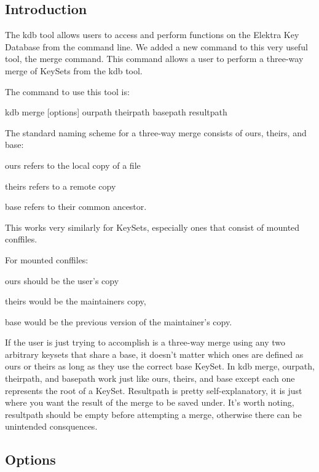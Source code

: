 \subsection*{Introduction}

The kdb tool allows users to access and perform functions on the Elektra Key Database from the command line. We added a new command to this very useful tool, the merge command. This command allows a user to perform a three-\/way merge of Key\+Sets from the kdb tool.

The command to use this tool is\+: \begin{DoxyVerb}    kdb merge [options] ourpath theirpath basepath resultpath
\end{DoxyVerb}


The standard naming scheme for a three-\/way merge consists of ours, theirs, and base\+:
\begin{DoxyItemize}
\item ours refers to the local copy of a file
\item theirs refers to a remote copy
\item base refers to their common ancestor.
\end{DoxyItemize}

This works very similarly for Key\+Sets, especially ones that consist of mounted conffiles.

For mounted conffiles\+:
\begin{DoxyItemize}
\item ours should be the user's copy
\item theirs would be the maintainers copy,
\item base would be the previous version of the maintainer's copy.
\end{DoxyItemize}

If the user is just trying to accomplish is a three-\/way merge using any two arbitrary keysets that share a base, it doesn't matter which ones are defined as ours or theirs as long as they use the correct base Key\+Set. In kdb merge, ourpath, theirpath, and basepath work just like ours, theirs, and base except each one represents the root of a Key\+Set. Resultpath is pretty self-\/explanatory, it is just where you want the result of the merge to be saved under. It's worth noting, resultpath should be empty before attempting a merge, otherwise there can be unintended consquences.

\subsection*{Options}

